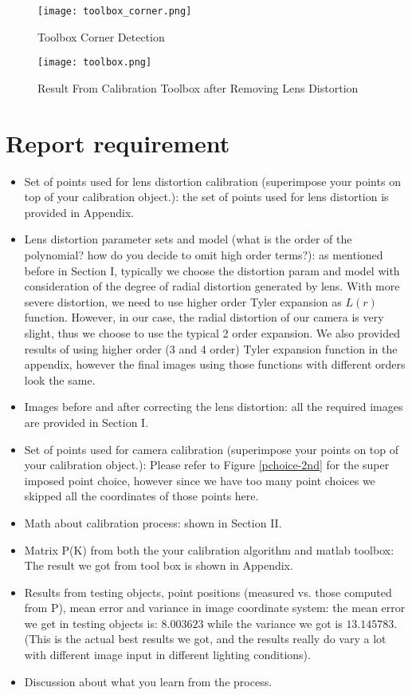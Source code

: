 \documentclass[conference]{IEEEtran}
\begin{document}
\begin{figure}
  \centering \texttt{[image: toolbox\_corner.png]}
  \caption{Toolbox Corner Detection}
  \label{toolbox_corner}
\end{figure}

\begin{figure}
  \centering \texttt{[image: toolbox.png]}
  \caption{Result From Calibration Toolbox after Removing Lens Distortion}
  \label{toolbox_result}
\end{figure}


\section{Report requirement}
\begin{itemize}
	\item Set of points used for lens distortion calibration (superimpose your points on top of your calibration object.): the set of points used for lens distortion is provided in Appendix.
	\item Lens distortion parameter sets and model (what is the order of the polynomial? how do you decide to omit high order terms?): as mentioned before in Section I, typically we choose the distortion param and model with consideration of the degree of radial distortion generated by lens. With more severe distortion, we need to use higher order Tyler expansion as $L(r)$ function. However, in our case, the radial distortion of our camera is very slight, thus we choose to use the typical 2 order expansion. We also provided results of using higher order (3 and 4 order) Tyler expansion function in the appendix, however the final images using those functions with different orders look the same.
	\item Images before and after correcting the lens distortion: all the required images are provided in Section I.
	\item Set of points used for camera calibration (superimpose your points on top of your calibration object.): Please refer to Figure \ref{pchoice-2nd} for the super imposed point choice, however since we have too many point choices we skipped all the coordinates of those points here.
	\item Math about calibration process: shown in Section II.
	\item Matrix P(K) from both the your calibration algorithm and matlab toolbox: The result we got from tool box is shown in Appendix.
	\item Results from testing objects, point positions (measured vs. those computed from P), mean error and variance in image coordinate system: the mean error we get in testing objects is: $8.003623$ while the variance we got is $13.145783$. (This is the actual best results we got, and the results really do vary a lot with different image input in different lighting conditions).
	\item Discussion about what you learn from the process.
\end{itemize}
\end{document}
